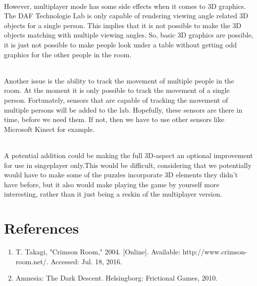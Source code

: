 \documentclass[11pt]{article}
\begin{document}
~\\
However, multiplayer mode has some side effects when it comes to 3D graphics. The DAF Technologie Lab is only capable of rendering viewing angle related 3D objects for a single person. This implies that it is not possible to make the 3D objects matching with multiple viewing angles. So, basic 3D graphics are possible, it is just not possible to make people look under a table without getting odd graphics for the other people in the room. 

~\\
Another issue is the ability to track the movement of multiple people in the room. At the moment it is only possible to track the movement of a single person. Fortunately, sensors that are capable of tracking the movement of multiple persons will be added to the lab. Hopefully, these sensors are there in time, before we need them. If not, then we have to use other sensors like Microsoft Kinect for example. 

~\\
A potential addition could be making the full 3D-aspect an optional improvement for use in singeplayer only.This would be difficult, considering that we potentially would have to make some of the puzzles incorporate 3D elements they didn't have before, but it also would make playing the game by yourself more interesting, rather than it just being a reskin of the multiplayer version. 

\newpage
{}
{}
\section*{References}
\begin{enumerate}
\item T. Takagi, "Crimson Room," 2004. [Online]. Available: http://www.crimson-room.net/. Accessed: Jul. 18, 2016.
\item Amnesia: The Dark Descent. Helsingborg: Frictional Games, 2010.	
\end{enumerate}
\end{document}
